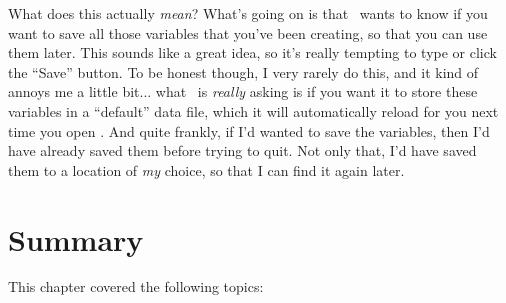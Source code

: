 What does this actually {\it mean}? What's going on is that \R\ wants to know if you want to save all those variables that you've been creating, so that you can use them later. This sounds like a great idea, so it's really tempting to type  or click the ``Save'' button. To be honest though, I very rarely do this, and it kind of annoys me a little bit... what \R\ is {\it really} asking is if you want it to store these variables in a ``default'' data file, which it will automatically reload for you next time you open \R. And quite frankly, if I'd wanted to save the variables, then I'd have already saved them before trying to quit. Not only that, I'd have saved them to a location of {\it my} choice, so that I can find it again later.



\section{Summary}\label{sec:summary2}

This chapter covered the following topics:


